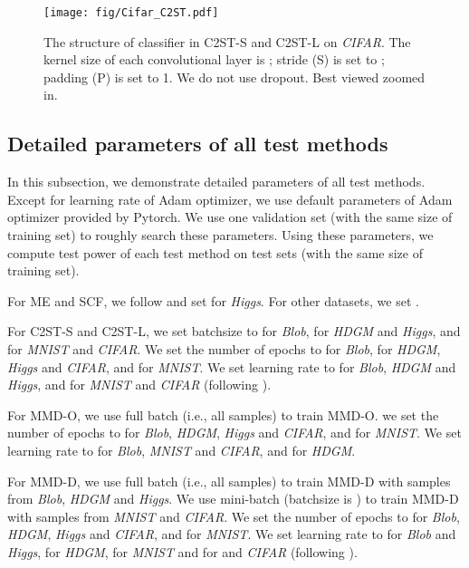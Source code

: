 \documentclass{article}
\begin{document}
\begin{figure}[!t]
    \begin{center}
        \texttt{[image: fig/Cifar\_C2ST.pdf]}
        \caption{The structure of classifier  in C2ST-S and C2ST-L on \emph{CIFAR}. The kernel size of each convolutional layer is ; stride (S) is set to ; padding (P) is set to 1. We do not use dropout. Best viewed zoomed in.} \label{fig:C2ST_CIFAR_F}
    \end{center}
\end{figure}

\subsection{Detailed parameters of all test methods}\label{Asec:para_set}

In this subsection, we demonstrate detailed parameters of all test methods. Except for learning rate of Adam optimizer, we use default parameters of Adam optimizer provided by Pytorch. We use one validation set (with the same size of training set) to roughly search these parameters. Using these parameters, we compute test power of each test method on  test sets (with the same size of training set).

For ME and SCF, we follow \citet{Chwialkowski2015} and set  for \emph{Higgs}. For other datasets, we set .

For C2ST-S and C2ST-L, we set batchsize to  for \emph{Blob},  for \emph{HDGM} and \emph{Higgs}, and  for \emph{MNIST} and \emph{CIFAR}. We set the number of epochs to  for \emph{Blob},  for \emph{HDGM}, \emph{Higgs} and \emph{CIFAR}, and  for \emph{MNIST}. We set learning rate to  for \emph{Blob}, \emph{HDGM} and \emph{Higgs}, and  for \emph{MNIST} and \emph{CIFAR} (following \citet{DCGAN_Radford}).

For MMD-O, we use full batch (i.e., all samples) to train MMD-O. we set the number of epochs to  for \emph{Blob}, \emph{HDGM}, \emph{Higgs} and \emph{CIFAR}, and  for \emph{MNIST}. We set learning rate to  for \emph{Blob}, \emph{MNIST} and \emph{CIFAR}, and  for \emph{HDGM}.

For MMD-D, we use full batch (i.e., all samples) to train MMD-D with samples from \emph{Blob}, \emph{HDGM} and \emph{Higgs}. We use mini-batch (batchsize is ) to train MMD-D with samples from \emph{MNIST} and \emph{CIFAR}. We set the number of epochs to  for \emph{Blob}, \emph{HDGM}, \emph{Higgs} and \emph{CIFAR}, and  for \emph{MNIST}. We set learning rate to  for \emph{Blob} and \emph{Higgs},  for \emph{HDGM},  for \emph{MNIST} and  for and \emph{CIFAR} (following \citet{DCGAN_Radford}). 
\end{document}
